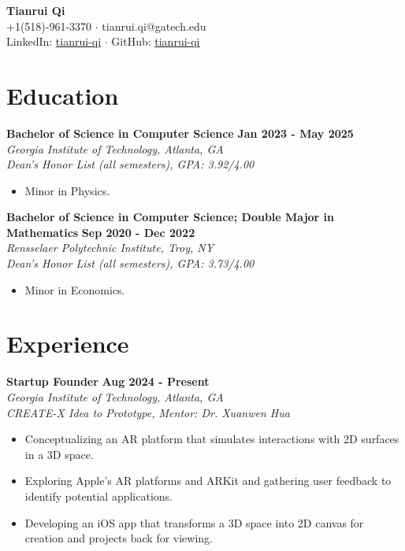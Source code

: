 \documentclass[letterpaper, 11pt]{article}
\newcommand{\subsectionvspace}{\vspace{6pt}}
\begin{document}
\begin{center}
    \textbf{\LARGE Tianrui Qi} \\
    +1(518)-961-3370 
    $\cdot$ 
    tianrui.qi@gatech.edu
    \\
    LinkedIn: \href{https://www.linkedin.com/in/tianrui-qi/}{\underline{tianrui-qi}}
    $\cdot$
    GitHub: \href{https://github.com/tianrui-qi}{\underline{tianrui-qi}}
\end{center}


\section{Education}


    \textbf{Bachelor of Science in Computer Science} \hfill 
    \textbf{Jan 2023 - May 2025} \\
    \textit{Georgia Institute of Technology, Atlanta, GA} \\ 
    \textit{Dean's Honor List (all semesters), GPA: 3.92/4.00}
    \begin{itemize}
        \item Minor in Physics.
    \end{itemize}

    \subsectionvspace

    \textbf{Bachelor of Science in Computer Science; Double Major in Mathematics} \hfill 
    \textbf{Sep 2020 - Dec 2022} \\
    \textit{Rensselaer Polytechnic Institute, Troy, NY} \\ 
    \textit{Dean's Honor List (all semesters), GPA: 3.73/4.00}
    \begin{itemize}
        \item Minor in Economics.
    \end{itemize}


\section{Experience}


    \textbf{Startup Founder} \hfill 
    \textbf{Aug 2024 - Present} \\
    \textit{Georgia Institute of Technology, Atlanta, GA} \\
    \textit{CREATE-X Idea to Prototype, Mentor: Dr. Xuanwen Hua}
    \begin{itemize}
        \item Conceptualizing an AR platform that simulates interactions with 2D surfaces in a 3D space.
        \item Exploring Apple's AR platforms and ARKit and gathering user feedback to identify potential applications. 
        \item Developing an iOS app that transforms a 3D space into 2D canvas for creation and projects back for viewing.
    \end{itemize}
\end{document}
